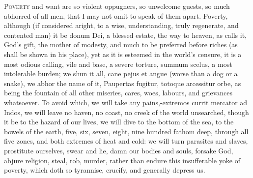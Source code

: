 {{\lettrine{P}{overty} and want are so violent oppugners, so unwelcome guests, so much
abhorred of all men, that I may not omit to speak of them apart.
Poverty, although (if considered aright, to a wise, understanding,
truly regenerate, and contented man) it be donum Dei, a blessed estate,
the way to heaven, as \Chrysostom{} calls it, God's gift, the mother
of modesty, and much to be preferred before riches (as shall be shown
in his place), yet as it is esteemed in the world's censure, it
is a most odious calling, vile and base, a severe torture, summum
scelus, a most intolerable burden; we shun it all, cane pejus et
angue (worse than a dog or a snake), we abhor the name of it,
Paupertas fugitur, totoque arcessitur orbe, as being the fountain
of all other miseries, cares, woes, labours, and grievances whatsoever.
To avoid which, we will take any pains,-extremos currit mercator ad
Indos, we will leave no haven, no coast, no creek of the world
unsearched, though it be to the hazard of our lives, we will dive to
the bottom of the sea, to the bowels of the earth, five, six,
seven, eight, nine hundred fathom deep, through all five zones, and
both extremes of heat and cold: we will turn parasites and slaves,
prostitute ourselves, swear and lie, damn our bodies and souls, forsake
God, abjure religion, steal, rob, murder, rather than endure this
insufferable yoke of poverty, which doth so tyrannise, crucify, and
generally depress us.

}}

